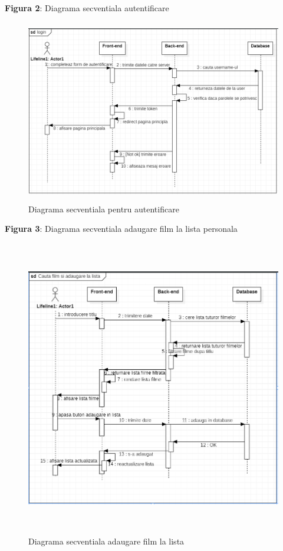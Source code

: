 \par \textbf{Figura 2}: Diagrama secventiala autentificare
		\begin{figure}[htbp]
			\centerline{\includegraphics[width=13cm, height=8cm]{figures/login diagrma secventiala.png}}
			\caption{Diagrama secventiala pentru autentificare}
			\label{fig}
		\end{figure}
\newline
\newline
\newline
\newline
\newline
\par \textbf{Figura 3}: Diagrama secventiala adaugare film la lista personala
		\begin{figure}[htbp]
			\centerline{\includegraphics[width=14cm, height=13cm]{figures/cauta si adauga.png}}
			\caption{Diagrama secventiala adaugare film la lista}
			\label{fig}
		\end{figure}

